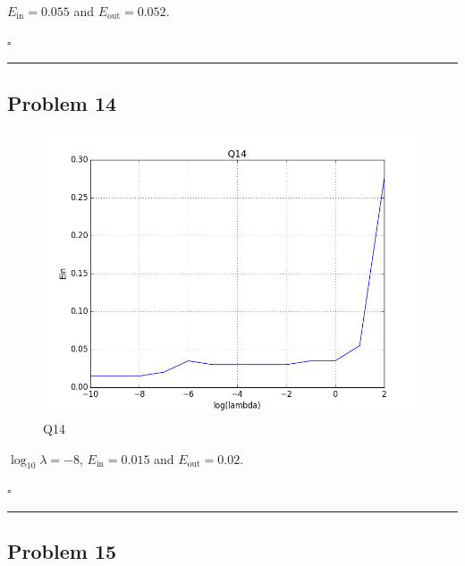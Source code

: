 \documentclass[12pt]{article}
\newcommand*{\QEDB}{\hfill\ensuremath{\square}}
\newcommand{\horrule}[1]{\rule{\linewidth}{#1}}
\begin{document}
$E_{\text{in}}=0.055$ and $E_{\text{out}}=0.052$.

\QEDB

\horrule{0.5pt}

\subsection*{Problem 14}

\begin{figure}[h]
	\centering
	\includegraphics[scale=0.3]{Q14.png}
	\caption{Q14}
	\label{Q14}
\end{figure}
$\log_{10}\lambda=-8$, $E_{\text{in}}=0.015$ and $E_{\text{out}}=0.02$.

\QEDB

\horrule{0.5pt}

\subsection*{Problem 15}
\end{document}
